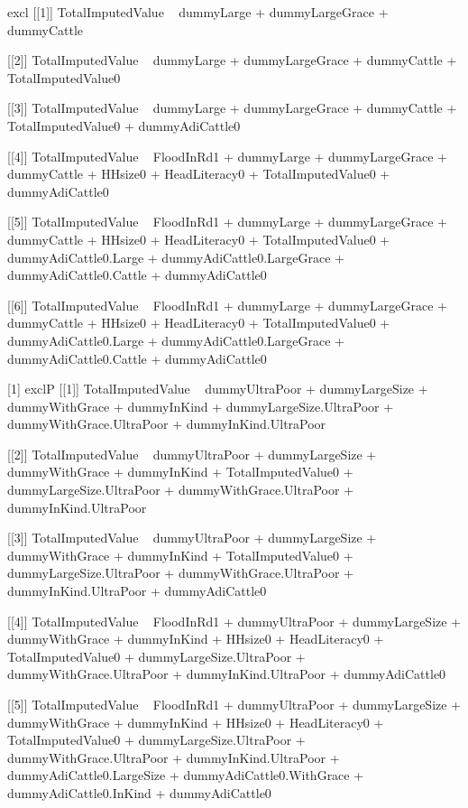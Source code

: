 \begin{Schunk}
\begin{Soutput}
[1] excl
[[1]]
TotalImputedValue ~ dummyLarge + dummyLargeGrace + dummyCattle

[[2]]
TotalImputedValue ~ dummyLarge + dummyLargeGrace + dummyCattle + 
    TotalImputedValue0

[[3]]
TotalImputedValue ~ dummyLarge + dummyLargeGrace + dummyCattle + 
    TotalImputedValue0 + dummyAdiCattle0

[[4]]
TotalImputedValue ~ FloodInRd1 + dummyLarge + dummyLargeGrace + 
    dummyCattle + HHsize0 + HeadLiteracy0 + TotalImputedValue0 + 
    dummyAdiCattle0

[[5]]
TotalImputedValue ~ FloodInRd1 + dummyLarge + dummyLargeGrace + 
    dummyCattle + HHsize0 + HeadLiteracy0 + TotalImputedValue0 + 
    dummyAdiCattle0.Large + dummyAdiCattle0.LargeGrace + dummyAdiCattle0.Cattle + 
    dummyAdiCattle0

[[6]]
TotalImputedValue ~ FloodInRd1 + dummyLarge + dummyLargeGrace + 
    dummyCattle + HHsize0 + HeadLiteracy0 + TotalImputedValue0 + 
    dummyAdiCattle0.Large + dummyAdiCattle0.LargeGrace + dummyAdiCattle0.Cattle + 
    dummyAdiCattle0

[1] exclP
[[1]]
TotalImputedValue ~ dummyUltraPoor + dummyLargeSize + dummyWithGrace + 
    dummyInKind + dummyLargeSize.UltraPoor + dummyWithGrace.UltraPoor + 
    dummyInKind.UltraPoor

[[2]]
TotalImputedValue ~ dummyUltraPoor + dummyLargeSize + dummyWithGrace + 
    dummyInKind + TotalImputedValue0 + dummyLargeSize.UltraPoor + 
    dummyWithGrace.UltraPoor + dummyInKind.UltraPoor

[[3]]
TotalImputedValue ~ dummyUltraPoor + dummyLargeSize + dummyWithGrace + 
    dummyInKind + TotalImputedValue0 + dummyLargeSize.UltraPoor + 
    dummyWithGrace.UltraPoor + dummyInKind.UltraPoor + dummyAdiCattle0

[[4]]
TotalImputedValue ~ FloodInRd1 + dummyUltraPoor + dummyLargeSize + 
    dummyWithGrace + dummyInKind + HHsize0 + HeadLiteracy0 + 
    TotalImputedValue0 + dummyLargeSize.UltraPoor + dummyWithGrace.UltraPoor + 
    dummyInKind.UltraPoor + dummyAdiCattle0

[[5]]
TotalImputedValue ~ FloodInRd1 + dummyUltraPoor + dummyLargeSize + 
    dummyWithGrace + dummyInKind + HHsize0 + HeadLiteracy0 + 
    TotalImputedValue0 + dummyLargeSize.UltraPoor + dummyWithGrace.UltraPoor + 
    dummyInKind.UltraPoor + dummyAdiCattle0.LargeSize + dummyAdiCattle0.WithGrace + 
    dummyAdiCattle0.InKind + dummyAdiCattle0


\end{Soutput}
\end{Schunk}
